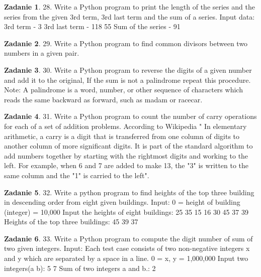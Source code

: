 \documentclass[11pt]{article}
\theoremstyle{definition}
\newtheorem{zadanie}{Zadanie}
\begin{document}
\begin{zadanie}


28. Write a Python program to print the length of the series and the series from the given 3rd term, 3rd last term and the sum of a series. 
Input data:
3rd term - 3
3rd last term - 118 55
Sum of the series - 91

\end{zadanie}

\begin{zadanie}


29. Write a Python program to find common divisors between two numbers in a given pair. 

\end{zadanie}

\begin{zadanie}


30. Write a Python program to reverse the digits of a given number and add it to the original, If the sum is not a palindrome repeat this procedure. 
Note: A palindrome is a word, number, or other sequence of characters which reads the same backward as forward, such as madam or racecar.

\end{zadanie}

\begin{zadanie}


31. Write a Python program to count the number of carry operations for each of a set of addition problems. 
According to Wikipedia " In elementary arithmetic, a carry is a digit that is transferred from one column of digits to another column of more significant digits. It is part of the standard algorithm to add numbers together by starting with the rightmost digits and working to the left. For example, when 6 and 7 are added to make 13, the "3" is written to the same column and the "1" is carried to the left".

\end{zadanie}

\begin{zadanie}


32. Write a python program to find heights of the top three building in descending order from eight given buildings. 
Input:
0 = height of building (integer) = 10,000
Input the heights of eight buildings:
25
35
15
16
30
45
37
39
Heights of the top three buildings:
45
39
37

\end{zadanie}

\begin{zadanie}


33. Write a Python program to compute the digit number of sum of two given integers. 
Input:
Each test case consists of two non-negative integers x and y which are separated by a space in a line.
0 = x, y = 1,000,000
Input two integers(a b):
5 7
Sum of two integers a and b.:
2

\end{zadanie}
\end{document}
